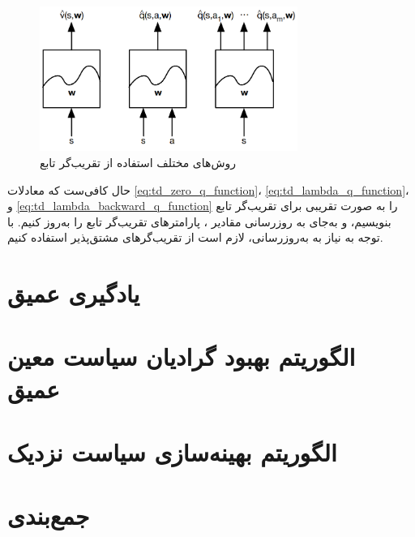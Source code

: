 \begin{figure}[H]
    \centering
    \includegraphics[width=0.75\textwidth]{images/function_approximators.png}
    \caption{روش‌های مختلف استفاده از تقریب‌گر تابع}\label{fig:func_approx}
\end{figure}
حال کافی‌ست که معادلات \ref{eq:td_zero_q_function}، \ref{eq:td_lambda_q_function}، و \ref{eq:td_lambda_backward_q_function} را به صورت تقریبی برای تقریب‌گر تابع بنویسیم،
و به‌جای به روزرسانی مقادیر ، پارامتر‌های تقریب‌گر تابع را به‌روز کنیم.
با توجه به نیاز به به‌روز‌رسانی، لازم است از تقریب‌گر‌های مشتق‌پذیر استفاده کنیم.

\section{یادگیری  عمیق}
\section{الگوریتم بهبود گرادیان سیاست معین عمیق}
\section{الگوریتم بهینه‌سازی سیاست نزدیک}\cite{PPO}
\section{جمع‌بندی}



